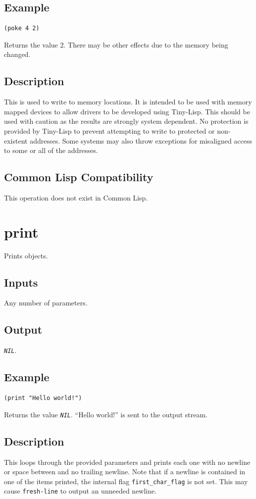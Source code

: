 \documentclass[10pt, openany]{book}
\newcommand{\constant}[1]{\emph{\texttt{#1}}}
\newcommand{\keyword}[1]{\texttt{#1}}
\newcommand{\tl}{Tiny-Lisp}
\newcommand{\cl}{Common Lisp}
\begin{document}
\subsection{Example}
\begin{lstlisting}
(poke 4 2)
\end{lstlisting}
Returns the value 2.  There may be other effects due to the memory being changed.
\subsection{Description}
This is used to write to memory locations.  It is intended to be used with memory mapped devices to allow drivers to be developed using \tl{}.  This should be used with caution as the results are strongly system dependent.  No protection is provided by \tl{} to prevent attempting to write to protected or non-existent addresses.  Some systems may also throw exceptions for misaligned access to some or all of the addresses.
\subsection{Common Lisp Compatibility}
This operation does not exist in \cl.

\section{print}
Prints objects.
\subsection{Inputs}
Any number of parameters.
\subsection{Output}
\constant{NIL}.
\subsection{Example}
\begin{lstlisting}
(print "Hello world!")
\end{lstlisting}
Returns the value \constant{NIL}.  ``Hello world!'' is sent to the output stream.
\subsection{Description}
This loops through the provided parameters and prints each one with no newline or space between and no trailing newline.  Note that if a newline is contained in one of the items printed, the internal flag \keyword{first\_char\_flag} is not set.  This may cause \keyword{fresh-line} to output an unneeded newline.
\end{document}
